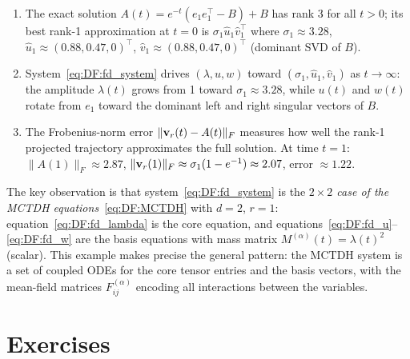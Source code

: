 \begin{example}
\begin{enumerate}
\item The exact solution $A(t) = e^{-t}(e_1 e_1^\top - B) + B$ has
    rank 3 for all $t > 0$; its best rank-1 approximation at $t = 0$
    is $\sigma_1 \hat{u}_1 \hat{v}_1^\top$ where $\sigma_1 \approx
    3.28$, $\hat{u}_1 \approx (0.88, 0.47, 0)^\top$,
    $\hat{v}_1 \approx (0.88, 0.47, 0)^\top$ (dominant SVD of $B$).
\item System~\eqref{eq:DF:fd_system} drives $(\lambda, u, w)$ toward
    $(\sigma_1, \hat{u}_1, \hat{v}_1)$ as $t \to \infty$: the
    amplitude $\lambda(t)$ grows from 1 toward $\sigma_1 \approx 3.28$,
    while $u(t)$ and $w(t)$ rotate from $e_1$ toward the dominant
    left and right singular vectors of $B$.
\item The Frobenius-norm error $\|\mathbf{v}_r(t) - A(t)\|_F$ measures how
    well the rank-1 projected trajectory approximates the full solution.
    At time $t=1$: $\|A(1)\|_F \approx 2.87$,
    $\|\mathbf{v}_r(1)\|_F \approx \sigma_1(1 - e^{-1}) \approx 2.07$,
    error $\approx 1.22$.
\end{enumerate}

The key observation is that system~\eqref{eq:DF:fd_system} is the
\emph{$2\times 2$ case of the MCTDH equations}~\eqref{eq:DF:MCTDH}
with $d=2$, $r=1$: equation~\eqref{eq:DF:fd_lambda} is the core
equation, and equations~\eqref{eq:DF:fd_u}--\eqref{eq:DF:fd_w} are
the basis equations with mass matrix $M^{(\alpha)}(t) = \lambda(t)^2$
(scalar). This example makes precise the general pattern: the MCTDH
system is a set of coupled ODEs for the core tensor entries and the
basis vectors, with the mean-field matrices $F^{(\alpha)}_{ij}$
encoding all interactions between the variables.
\end{example}

\section{Exercises}
\label{sec:DF:exercises}

